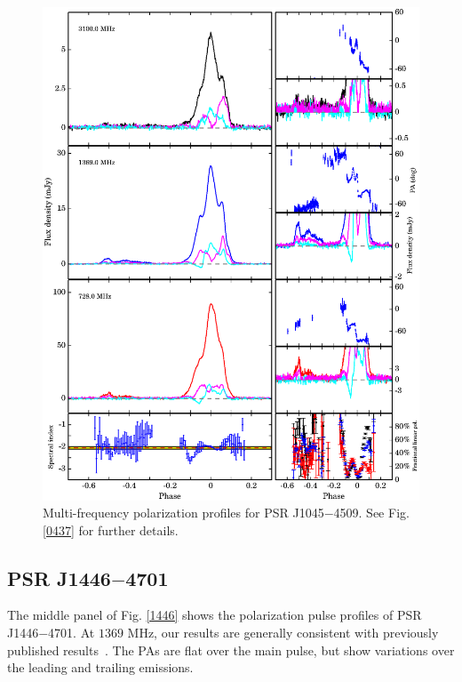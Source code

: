 \documentclass[useAMS,usenatbib]{mn2e}
\begin{document}
\begin{figure}
\begin{center}
\includegraphics[width=6 in]{1045.ps}
\caption{Multi-frequency polarization profiles for PSR J1045$-$4509. 
See Fig. \ref{0437} for further details.}
\label{1045}
\end{center}
\end{figure}

\subsection{PSR J1446$-$4701}

The middle panel of Fig. \ref{1446} shows the polarization pulse profiles of 
PSR J1446$-$4701.
%
At $1369$ MHz, our results are generally consistent with previously published
results~\citep{Keith12}.
%
The PAs are flat over the main pulse, but show variations over the leading and 
trailing emissions.
%
\end{document}
